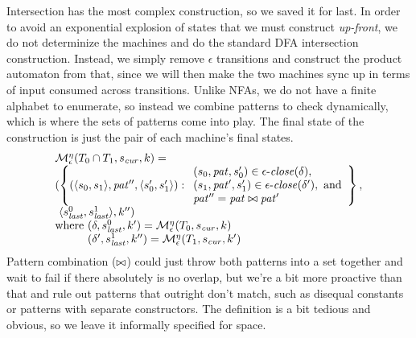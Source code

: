 Intersection has the most complex construction, so we saved it for last.
%
In order to avoid an exponential explosion of states that we must construct \emph{up-front}, we do not determinize the machines and do the standard DFA intersection construction.
%
Instead, we simply remove $\epsilon$ transitions and construct the product automaton from that, since we will then make the two machines sync up in terms of input consumed across transitions.
%
Unlike NFAs, we do not have a finite alphabet to enumerate, so instead we combine patterns to check dynamically, which is where the sets of patterns come into play.
%
The final state of the construction is just the pair of each machine's final states.
\begin{align*}
  \begin{array}{l}
  \epshelp^\mtimeline(\stAnd{\mtcon_0}{\mtcon_1}, \pmsmqcur, k) = \\
  (\left\{(\pmsmpair{\pmsmqq_0}{\pmsmqq_1}, \mpat'', \pmsmpair{\pmsmqq'_0}{\pmsmqq'_1}) :
          \begin{array}{l}
                (\pmsmqq_0, \mpat, \pmsmqq'_0) \in \epsclose(\delta),\\
                (\pmsmqq_1, \mpat', \pmsmqq'_1) \in \epsclose(\delta'), \text{ and}\\
                \mpat'' = \combinepat{\mpat}{\mpat'}
           \end{array} \right\},\\
  \ \pmsmpair{\pmsmqlast^0}{\pmsmqlast^1}, k'') \\
  \text{where } (\delta, \pmsmqlast^0, k') = \epshelp^\mtimeline(\mtcon_0, \pmsmqcur, k) \\
  \phantom{\text{where }} (\delta', \pmsmqlast^1, k'') = \epshelp^\mtimeline(\mtcon_1, \pmsmqcur, k')
\end{array}
\end{align*}
%
Pattern combination ($\bowtie$) could just throw both patterns into a set together and wait to fail if there absolutely is no overlap, but we're a bit more proactive than that and rule out patterns that outright don't match, such as disequal constants or patterns with separate constructors.
%
The definition is a bit tedious and obvious, so we leave it informally specified for space.

